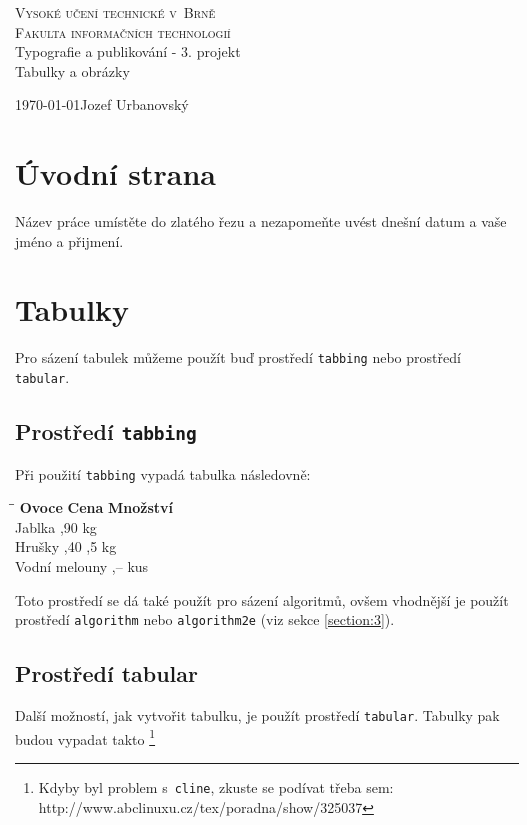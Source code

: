 \documentclass[a4paper,11pt]{article}
\begin{document}
	\begin{center}
		\Huge
		\textsc{\Huge{Vysoké učení technické v~Brně}\\
			\huge{Fakulta informačních technologií}}\\
		\Large{Typografie a publikování - 3. projekt}\\
		\Huge{Tabulky a obrázky}
	\end{center}
	\thispagestyle{empty}
	\normalsize{\today \hfill Jozef Urbanovský}
	\newpage
	
	\setcounter{page}{1}
	\section{Úvodní strana}\label{section:1}
	Název práce umístěte do zlatého řezu a nezapomeňte uvést dnešní datum a vaše jméno a přijmení.
	
	\section{Tabulky}\label{section:2}
	Pro sázení tabulek můžeme použít buď prostředí \texttt{tabbing} nebo prostředí \texttt{tabular}.
	
	\subsection{Prostředí \texttt{tabbing}}
	Při použití \texttt{tabbing} vypadá tabulka následovně:
	\begin{tabbing}
		\hspace*{3cm}\=\hspace*{1.5cm}\= \kill
		\textbf{Ovoce} \> \textbf{Cena} \> \textbf{Množství} \\
		Jablka ,90  kg\\
		Hrušky ,40 ,5 kg\\
		Vodní melouny ,--  kus
	\end{tabbing}
	\bigskip
	
	\noindent Toto prostředí se dá také použít pro sázení algoritmů, ovšem vhodnější je použít 
	prostředí \texttt{algorithm} nebo \texttt{algorithm2e} (viz sekce \ref{section:3}).
	
	\subsection{Prostředí tabular}
	Další možností, jak vytvořit tabulku, je použít prostředí \texttt{tabular}. 
	Tabulky pak budou vypadat takto
	\footnote{Kdyby byl problem s~\texttt{cline}, zkuste se podívat třeba sem: 
		http://www.abclinuxu.cz/tex/poradna/show/325037 \vspace{\fill}}
	\bigskip
	
\end{document}
